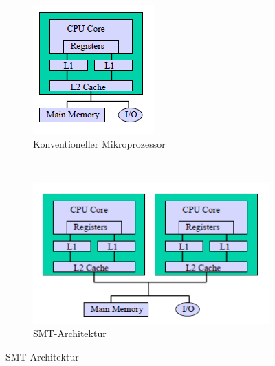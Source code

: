 \begin{figure}
	\centering
	\begin{subfigure}[b]{0.15\textwidth}
		\includegraphics[width=\textwidth]{fig/mc_one}
		\caption{Konventioneller Mikroprozessor}
		\label{fig:mc_conventional}
	\end{subfigure}
	~
	\begin{subfigure}[b]{0.27\textwidth}
		\includegraphics[width=\textwidth]{fig/mc_simple_chip}
		\caption{SMT-Architektur}
		\label{fig:mc_simple_chip}
	\end{subfigure}

\end{figure}
